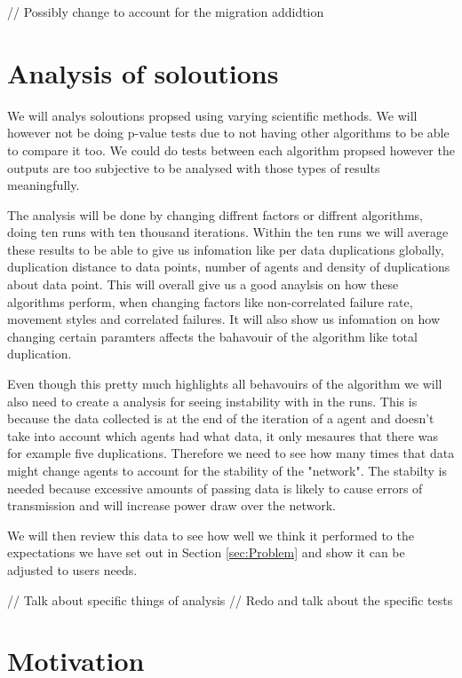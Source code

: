 \documentclass{UoYCSproject}
\begin{document}
// Possibly change to account for the migration addidtion


\section{Analysis of soloutions}
\label{sec:Analysis of soloutions}

We will analys soloutions propsed using varying scientific methods.
We will however not be doing p-value tests due to not having other algorithms to be able to compare it too.
We could do tests between each algorithm propsed however the outputs are too subjective to be analysed with those types of results meaningfully.

The analysis will be done by changing diffrent factors or diffrent algorithms, doing ten runs with ten thousand iterations.
Within the ten runs we will average these results to be able to give us infomation like per data duplications globally, duplication distance to data points, number of agents and density of duplications about data point.
This will overall give us a good anaylsis on how these algorithms perform, when changing factors like non-correlated failure rate, movement styles and correlated failures.
It will also show us infomation on how changing certain paramters affects the bahavouir of the algorithm like total duplication.

Even though this pretty much highlights all behavouirs of the algorithm we will also need to create a analysis for seeing instability with in the runs.
This is because the data collected is at the end of the iteration of a agent and doesn't take into account which agents had what data, it only mesaures that there was for example five duplications.
Therefore we need to see how many times that data might change agents to account for the stability of the "network".
The stabilty is needed because excessive amounts of passing data is likely to cause errors of transmission and will increase power draw over the network.

We will then review this data to see how well we think it performed to the expectations we have set out in Section \ref{sec:Problem} and show it can be adjusted to users needs.

// Talk about specific things of analysis
// Redo and talk about the specific tests



\section{Motivation}
\label{sec:Motivation}
\end{document}
